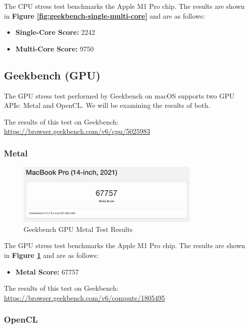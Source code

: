\documentclass[a4paper]{article}
\begin{document}
The CPU stress test benchmarks the Apple M1 Pro chip. The results are shown in \textbf{Figure \ref{fig:geekbench-single-multi-core}} and are as follows:

\begin{itemize}
    \item \textbf{Single-Core Score:} 2242
    \item \textbf{Multi-Core Score:} 9750
\end{itemize}

\subsection{Geekbench (GPU)}

The GPU stress test performed by Geekbench on macOS supports two GPU APIs: Metal and OpenCL. We will be examining the results of both.

The results of this test on Geekbench: \url{https://browser.geekbench.com/v6/cpu/5025983}

\subsubsection{Metal}

\begin{figure}[h!]
    \centering
    \includegraphics[width=0.8\textwidth]{images/geekbench-gpu-metal.png}
    \caption{Geekbench GPU Metal Test Results}
    \label{fig:geekbench-gpu-metal}
\end{figure}

The GPU stress test benchmarks the Apple M1 Pro chip. The results are shown in \textbf{Figure \ref{fig:geekbench-gpu-metal}} and are as follows:

\begin{itemize}
    \item \textbf{Metal Score:} 67757
\end{itemize}

The results of this test on Geekbench: \url{https://browser.geekbench.com/v6/compute/1805495}

\subsubsection{OpenCL}
\end{document}
